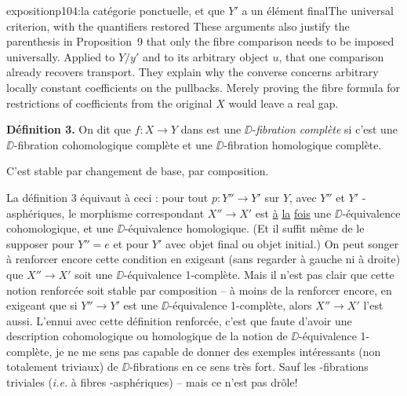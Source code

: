 \begin{dcomment}{exposition}{p104:la catégorie ponctuelle, et que $Y'$ a un élément final}{The universal criterion, with the quantifiers restored}
These arguments also justify the parenthesis in Proposition~9 that only the fibre comparison needs to be imposed universally. Applied to $Y/y'$ and to its arbitrary object $u$, that one comparison already recovers transport. They explain why the converse concerns arbitrary locally constant coefficients on the pullbacks. Merely proving the fibre formula for restrictions of coefficients from the original $X$ would leave a real gap.
\end{dcomment}


\textbf{Définition 3.} On dit que $f : X \to Y$ dans \Dia{} est une $\DD$-\textit{fibration complète} si c’est une $\DD$-fibration cohomologique complète et une $\DD$-fibration homologique complète.

C’est stable par changement de base, par composition.

La définition 3 équivaut à ceci : pour tout $p : Y'' \to Y'$ sur $Y$, avec $Y''$ et $Y'$ \Hot-asphériques, le morphisme correspondant $X'' \to X'$ est \underline{à} \underline{la} \underline{fois} une $\DD$-équivalence cohomologique, et une $\DD$-équivalence homologique. (Et il suffit même de le supposer pour $Y'' = e$ et pour $Y'$ avec objet final ou objet initial.) On peut songer à renforcer encore cette condition en exigeant (sans regarder à gauche ni à droite) que $X'' \to X'$ soit une $\DD$-équivalence 1-complète. Mais il n’est pas clair que cette notion renforcée soit stable par composition – à moins de la renforcer encore, en exigeant que si $Y'' \to Y'$ est une $\DD$-équivalence 1-complète, alors $X'' \to X'$ l’est aussi. L’ennui avec cette définition renforcée, c’est que faute d’avoir une description cohomologique ou homologique de la notion de
$\DD$-équivalence 1-complète, je ne me sens pas capable de donner des exemples intéressants (non totalement triviaux) de $\DD$-fibrations en ce sens très fort. Sauf les \Hot-fibrations triviales (\textit{i.e.} à fibres \Hot-asphériques) – mais ce n’est pas drôle!

